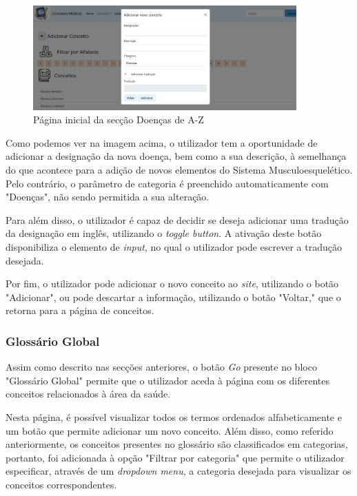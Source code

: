 \begin{figure}[H]
    \centering
    \centering
    \includegraphics[width=0.9\textwidth]{Images/doencas_adicionar_conceito.png}
    \caption{Página inicial da secção Doenças de A-Z}
    \label{fig:dic-traduc1}
\end{figure}

Como podemos ver na imagem acima, o utilizador tem a oportunidade de adicionar a designação da nova doença, bem como a sua descrição, à semelhança do que acontece para a adição de novos elementos do Sistema Musculoesquelético. Pelo contrário, o parâmetro de categoria é preenchido automaticamente com "Doenças", não sendo permitida a sua alteração. 

Para além disso, o utilizador é capaz de decidir se deseja adicionar uma tradução da designação em inglês, utilizando o \textit{toggle button}. A ativação deste botão disponibiliza o elemento de \textit{input}, no qual o utilizador pode escrever a tradução desejada. 

Por fim, o utilizador pode adicionar o novo conceito ao \textit{site}, utilizando o botão "Adicionar", ou pode descartar a informação, utilizando o botão "Voltar," que o retorna para a página de conceitos.

\subsubsection{Glossário Global}

Assim como descrito nas secções anteriores, o botão \textit{Go} presente no bloco "Glossário Global" permite que o utilizador aceda à página com os diferentes conceitos relacionados à área da saúde.

Nesta página, é possível visualizar todos os termos ordenados alfabeticamente e um botão que permite adicionar um novo conceito. Além disso, como referido anteriormente, os conceitos presentes no glossário são classificados em categorias, portanto, foi adicionada à opção "Filtrar por categoria" que permite o utilizador especificar, através de um \textit{dropdown menu}, a categoria desejada para visualizar os conceitos correspondentes.

